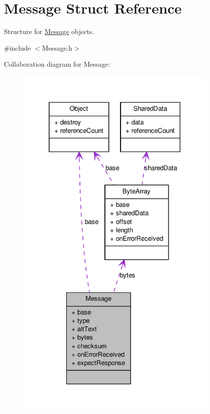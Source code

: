 \hypertarget{struct_message}{
\section{Message Struct Reference}
\label{struct_message}
}


Structure for \hyperlink{struct_message}{Message} objects.  




{\ttfamily \#include $<$Message.h$>$}



Collaboration diagram for Message:\nopagebreak
\begin{figure}[H]
\begin{center}
\leavevmode
\includegraphics[width=282pt]{struct_message__coll__graph}
\end{center}
\end{figure}
